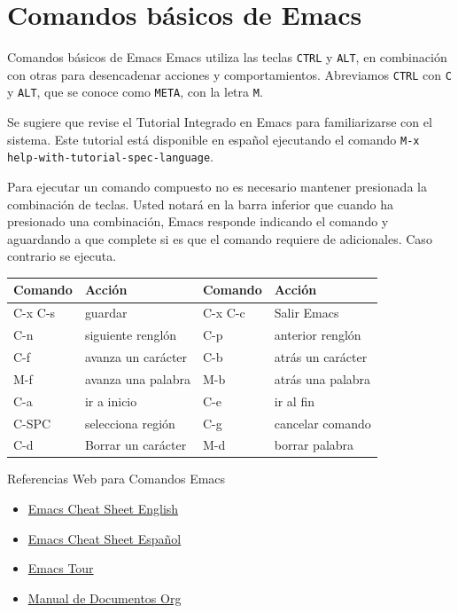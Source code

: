 \documentclass[presentation]{beamer}
\begin{document}
\section{Comandos básicos de Emacs}
\label{sec:org0554ccf}
\begin{frame}{Comandos básicos de Emacs}
 Emacs utiliza las teclas \texttt{CTRL} y \texttt{ALT}, en combinación con otras para
desencadenar acciones y comportamientos. Abreviamos \texttt{CTRL} con \texttt{C} y
\texttt{ALT}, que se conoce como \texttt{META}, con la letra \texttt{M}.

Se sugiere que revise el Tutorial Integrado en Emacs para
familiarizarse con el sistema. Este tutorial está disponible en
español ejecutando el comando \texttt{M-x help-with-tutorial-spec-language}.

Para ejecutar un comando compuesto no es necesario mantener presionada
la combinación de teclas. Usted notará en la barra inferior que cuando
ha presionado una combinación, Emacs responde indicando el comando y
aguardando a que complete si es que el comando requiere de
adicionales. Caso contrario se ejecuta.


\begin{center}
\begin{tabular}{|l|l|l|l|}
\hline
Comando & Acción & Comando & Acción \\
\hline
C-x C-s & guardar & C-x C-c & Salir Emacs \\
\hline
C-n & siguiente renglón & C-p & anterior renglón \\
\hline
C-f & avanza un carácter & C-b & atrás un carácter \\
\hline
M-f & avanza una palabra & M-b & atrás una palabra \\
\hline
C-a & ir a inicio & C-e & ir al fin \\
\hline
C-SPC & selecciona región & C-g & cancelar comando \\
\hline
C-d & Borrar un carácter & M-d & borrar palabra \\
\hline
\end{tabular}
\end{center}
\end{frame}
\begin{frame}[label={sec:org85329d3}]{Referencias Web para Comandos Emacs}
\begin{itemize}
\item \href{https://quickref.me/emacs.html}{Emacs Cheat Sheet English}
\item \href{https://cheatography.com/peraza00/cheat-sheets/emacs-guide/\#google\_vignette}{Emacs Cheat Sheet Español}
\item \href{https://www.gnu.org/software/emacs/tour/}{Emacs Tour}
\item \href{https://orgmode.org/manuals.html}{Manual de Documentos Org}
\end{itemize}
\end{frame}
\end{document}
